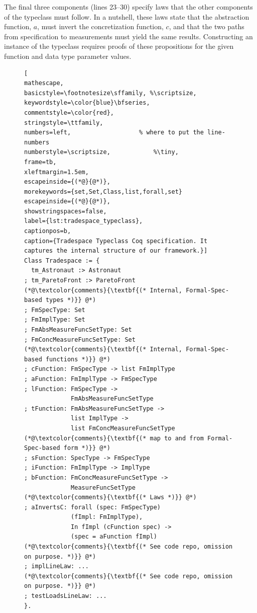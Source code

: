 \documentclass[10pt,conference]{IEEEtran}
\begin{document}
The final three components (lines 23--30) specify laws that the other components of the typeclass must follow. In a nutshell, these laws state that the abstraction function, $a$, must invert the concretization function, $c$, and that the two paths from specification to measurements must yield the same results. Constructing an instance of the typeclass requires proofs of these propositions for the given function and data type parameter values.

\begin{figure}
\vspace{0.5cm}
\begin{lstlisting}[
mathescape,
basicstyle=\footnotesize\sffamily, %\scriptsize,
keywordstyle=\color{blue}\bfseries,
commentstyle=\color{red},
stringstyle=\ttfamily,
numbers=left,					% where to put the line-numbers
numberstyle=\scriptsize,			%\tiny,      
frame=tb,
xleftmargin=1.5em,
escapeinside={(*@}{@*)},	
morekeywords={set,Set,Class,list,forall,set}
escapeinside={(*@}{@*)},
showstringspaces=false,
label={lst:tradespace_typeclass},
captionpos=b,
caption={Tradespace Typeclass Coq specification. It captures the internal structure of our framework.}]
Class Tradespace := {
  tm_Astronaut :> Astronaut
; tm_ParetoFront :> ParetoFront
(*@\textcolor{comments}{\textbf{(* Internal, Formal-Spec-based types *)}} @*)
; FmSpecType: Set
; FmImplType: Set
; FmAbsMeasureFuncSetType: Set
; FmConcMeasureFuncSetType: Set
(*@\textcolor{comments}{\textbf{(* Internal, Formal-Spec-based functions *)}} @*)
; cFunction: FmSpecType -> list FmImplType
; aFunction: FmImplType -> FmSpecType
; lFunction: FmSpecType ->
             FmAbsMeasureFuncSetType
; tFunction: FmAbsMeasureFuncSetType ->
             list ImplType ->
             list FmConcMeasureFuncSetType
(*@\textcolor{comments}{\textbf{(* map to and from Formal-Spec-based form *)}} @*)             
; sFunction: SpecType -> FmSpecType
; iFunction: FmImplType -> ImplType
; bFunction: FmConcMeasureFuncSetType ->
             MeasureFuncSetType
(*@\textcolor{comments}{\textbf{(* Laws *)}} @*)             
; aInvertsC: forall (spec: FmSpecType)
             (fImpl: FmImplType),
             In fImpl (cFunction spec) ->
             (spec = aFunction fImpl)
(*@\textcolor{comments}{\textbf{(* See code repo, omission on purpose. *)}} @*)                          
; implLineLaw: ...
(*@\textcolor{comments}{\textbf{(* See code repo, omission on purpose. *)}} @*)                          
; testLoadsLineLaw: ...
}.
\end{lstlisting}
\end{figure}
\end{document}
